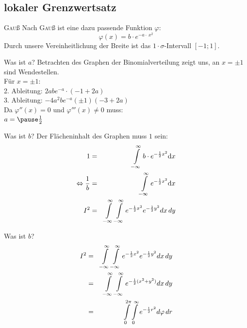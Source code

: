 \documentclass[14pt]{beamer}
\begin{document}
\subsection{lokaler Grenzwertsatz}
\begin{frame}{\textrm{\textsc{Gau}ß}}
Nach \textrm{\textsc{Gau}ß} ist eine dazu passende Funktion $\varphi$:
$$
\varphi(x)=b\cdot e^{-a\cdot\ x^2}
$$
Durch unsere Vereinheitlichung der Breite ist das $1\cdot \sigma$-Intervall $[-1;1]$.
\end{frame}


\begin{frame}{Was ist $a$?}
Betrachten des Graphen der Binomialverteilung zeigt uns, an $x=\pm 1$ sind Wendestellen.\\
Für $x=\pm 1$:\\
2. Ableitung: $2abe^{-a} \cdot (-1+2 a)$\\
3. Ableitung: $-4 a^{2} b e^{-a} (\pm1) (-3+2 a)$\\

Da $\varphi''(x)=0$ und $\varphi'''(x)\neq0$ muss:\\
$a=\pause\frac{1}{2}$
\end{frame}

\begin{frame}{Was ist $b$?}
Der Flächeninhalt des Graphen muss $1$ sein:
\begin{eqnarray}
1&=&\int\displaylimits^{\infty}_{-\infty} b \cdot e^{-\frac{1}{2}x^2} {\mathrm d}x \\
\Leftrightarrow \frac{1}{b}&=&\int\displaylimits^{\infty}_{-\infty} e^{-\frac{1}{2}x^2} {\mathrm d}x \\
I^2 &=& \int\displaylimits^{\infty}_{-\infty} \int\displaylimits^{\infty}_{-\infty} e^{-\frac{1}{2}x^2} e^{-\frac{1}{2}y^2} dx \, dy
\end{eqnarray}
\end{frame}

\begin{frame}[allowframebreaks]{Was ist $b$?}
\small
\begin{eqnarray}
I^2 &=& \int\displaylimits^{\infty}_{-\infty} \int\displaylimits^{\infty}_{-\infty} e^{-\frac{1}{2}x^2} e^{-\frac{1}{2}y^2} dx \, dy \\
&=& \int\displaylimits^{\infty}_{-\infty} \int\displaylimits^{\infty}_{-\infty} e^{-\frac{1}{2}(x^2 + y^2)} dx \, dy \\ 
&=& \int\displaylimits^{2 \pi}_{0} \int\displaylimits^{\infty}_{0} e^{-\frac{1}{2}r^2} d\varphi \, dr
\end{eqnarray}
\end{frame}
\end{document}
